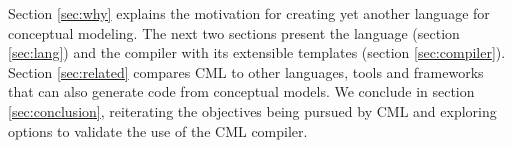 Section \ref{sec:why} explains the motivation for creating yet another language for conceptual modeling.
The next two sections present the language (section \ref{sec:lang})
and the compiler with its extensible templates (section \ref{sec:compiler}).
Section \ref{sec:related} compares CML to other languages, tools and frameworks
that can also generate code from conceptual models.
We conclude in section \ref{sec:conclusion},
reiterating the objectives being pursued by CML
and exploring options to validate the use of the CML compiler.

